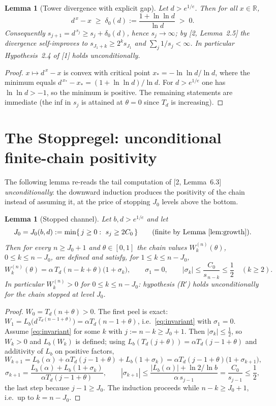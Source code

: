 \documentclass[11pt]{article}
\newtheorem{lemma}[theorem]{Lemma}
\newcommand{\R}{\mathbb{R}}
\begin{document}
\begin{lemma}[Tower divergence with explicit gap]\label{lem:growth}
Let $d>e^{1/e}$.  Then for all $x\in\R$,
\[
d^{\,x}-x\;\ge\;\delta_0(d):=\frac{1+\ln\ln d}{\ln d}\;>\;0 .
\]
Consequently $s_{j+1}=d^{\,s_j}\ge s_j+\delta_0(d)$, hence $s_j\to\infty$;
by [2, Lemma~2.5] the divergence self-improves to
$s_{J_1+k}\ge 2^{k}s_{J_1}$ and $\sum_j 1/s_j<\infty$.
In particular Hypothesis~2.4 of {\rm[1]} holds unconditionally.
\end{lemma}

\begin{proof}
$x\mapsto d^{\,x}-x$ is convex with critical point
$x_*=-\ln\ln d/\ln d$, where the minimum equals
$d^{\,x_*}-x_*=(1+\ln\ln d)/\ln d$.  For $d>e^{1/e}$ one has
$\ln\ln d>-1$, so the minimum is positive.  The remaining statements are
immediate (the inf in $s_j$ is attained at $\theta=0$ since $T_d$ is
increasing).
\end{proof}

\section{The Stoppregel: unconditional finite-chain positivity}\label{sec:stop}

The following lemma re-reads the tail computation of [2, Lemma~6.3]
\emph{unconditionally}: the downward induction produces the positivity of the
chain instead of assuming it, at the price of stopping $J_0$ levels above the
bottom.

\begin{lemma}[Stopped channel]\label{lem:stoppregel}
Let $b,d>e^{1/e}$ and let
\[
J_0=J_0(b,d):=\min\{\,j\ge0:\ s_j\ge 2C_0\,\}\qquad(\text{finite by
Lemma~\ref{lem:growth}}).
\]
Then for every $n\ge J_0+1$ and $\theta\in[0,1]$ the chain values
$W_k^{(n)}(\theta)$, $0\le k\le n-J_0$, are defined and satisfy, for
$1\le k\le n-J_0$,
\begin{equation}\label{eq:invariant}
W_k^{(n)}(\theta)=\alpha\,T_d(n-k+\theta)\bigl(1+\sigma_k\bigr),
\qquad
\sigma_1=0,\qquad
|\sigma_k|\le \frac{C_0}{s_{\,n-k}}\le\frac12\quad(k\ge2).
\end{equation}
In particular $W_k^{(n)}>0$ for $0\le k\le n-J_0$: hypothesis {\rm(R$'$)}
holds unconditionally for the chain stopped at level $J_0$.
\end{lemma}

\begin{proof}
$W_0=T_d(n+\theta)>0$.  The first peel is exact:
$W_1=L_b\bigl(d^{\,T_d(n-1+\theta)}\bigr)=\alpha T_d(n-1+\theta)$, i.e.\
\eqref{eq:invariant} with $\sigma_1=0$.  Assume \eqref{eq:invariant} for some
$k$ with $j:=n-k\ge J_0+1$.  Then $|\sigma_k|\le\frac12$, so $W_k>0$ and
$L_b(W_k)$ is defined; using
$L_b(T_d(j+\theta))=\alpha T_d(j-1+\theta)$ and additivity of $L_b$ on
positive factors,
\[
W_{k+1}
=L_b(\alpha)+\alpha T_d(j-1+\theta)+L_b(1+\sigma_k)
=\alpha T_d(j-1+\theta)\bigl(1+\sigma_{k+1}\bigr),
\]
\[
\sigma_{k+1}=\frac{L_b(\alpha)+L_b(1+\sigma_k)}{\alpha T_d(j-1+\theta)},
\qquad
|\sigma_{k+1}|\le\frac{|L_b(\alpha)|+\ln2/\ln b}{\alpha\,s_{j-1}}
=\frac{C_0}{s_{j-1}}\le\frac12,
\]
the last step because $j-1\ge J_0$.  The induction proceeds while
$n-k\ge J_0+1$, i.e.\ up to $k=n-J_0$.
\end{proof}
\end{document}
